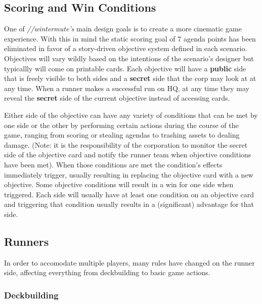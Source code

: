 \documentclass[titlepage]{article}
\begin{document}
\subsection{Scoring and Win Conditions}

One of \emph{//wintermute's} main design goals is to create a more cinematic game experience. With this in mind the static scoring goal of 7 agenda points has been eliminated in favor of a story-driven objective system defined in each scenario. Objectives will vary wildly based on the intentions of the scenario's designer but typicallly will come on printable cards. Each objective will have a \textbf{public} side that is freely visible to both sides and a \textbf{secret} side that the corp may look at at any time. When a runner makes a successful run on HQ, at any time they may reveal the \textbf{secret} side of the current objective instead of accessing cards.

Either side of the objective can have any variety of conditions that can be met by one side or the other by performing certain actions during the course of the game, ranging from scoring or stealing agendas to trashing assets to dealing damage. (Note: it is the responsibility of the corporation to monitor the secret side of the objective card and notify the runner team when objective conditions have been met). When those conditions are met the condition's effects immediately trigger, usually resulting in replacing the objective card with a new objective. Some objective conditions will result in a win for one side when triggered. Each side will usually have at least one condition on an objective card and triggering that condition usually results in a (significant) advantage for that side. 

\subsection{Runners}

In order to accomodate multiple players, many rules have changed on the runner side, affecting everything from deckbuilding to basic game actions.

\subsubsection{Deckbuilding}
\end{document}
